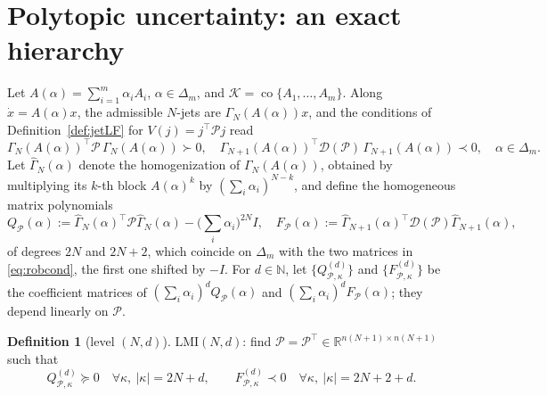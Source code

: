 \documentclass[preprint,12pt,authoryear]{elsarticle}
\theoremstyle{definition}
\newtheorem{definition}[theorem]{Definition}
\theoremstyle{remark}
\newcommand{\R}{\mathbb{R}}
\newcommand{\N}{\mathbb{N}}
\newcommand{\tr}{^{\top}}
\newcommand{\PP}{\mathcal{P}}
\newcommand{\DD}{\mathcal{D}}
\newcommand{\KK}{\mathcal{K}}
\DeclareMathOperator{\co}{co}
\begin{document}
\section{Polytopic uncertainty: an exact hierarchy}\label{sec:polytope}

Let $A(\alpha)=\sum_{i=1}^m\alpha_iA_i$, $\alpha\in\Delta_m$, and $\KK=\co\{A_1,\dots,A_m\}$. Along $\dot x=A(\alpha)x$, the admissible $N$-jets are $\Gamma_N(A(\alpha))x$, and the conditions of Definition~\ref{def:jetLF} for $V(j)=j\tr\PP j$ read
\begin{equation}\label{eq:robcond}
\Gamma_N(A(\alpha))\tr\PP\,\Gamma_N(A(\alpha))\succ0,\quad\Gamma_{N+1}(A(\alpha))\tr\DD(\PP)\,\Gamma_{N+1}(A(\alpha))\prec0,\quad\alpha\in\Delta_m .
\end{equation}
Let $\hat\Gamma_N(\alpha)$ denote the homogenization of $\Gamma_N(A(\alpha))$, obtained by multiplying its $k$-th block $A(\alpha)^k$ by $(\sum_i\alpha_i)^{N-k}$, and define the homogeneous matrix polynomials
\begin{equation}\label{eq:FQ}
Q_\PP(\alpha):=\hat\Gamma_N(\alpha)\tr\PP\hat\Gamma_N(\alpha)-\Big(\sum_i\alpha_i\Big)^{2N}I,\quad F_\PP(\alpha):=\hat\Gamma_{N+1}(\alpha)\tr\DD(\PP)\hat\Gamma_{N+1}(\alpha),
\end{equation}
of degrees $2N$ and $2N+2$, which coincide on $\Delta_m$ with the two matrices in \eqref{eq:robcond}, the first one shifted by $-I$. For $d\in\N$, let $\{Q^{(d)}_{\PP,\kappa}\}$ and $\{F^{(d)}_{\PP,\kappa}\}$ be the coefficient matrices of $(\sum_i\alpha_i)^dQ_\PP(\alpha)$ and $(\sum_i\alpha_i)^dF_\PP(\alpha)$; they depend linearly on $\PP$.

\begin{definition}[level $(N,d)$]
$\mathrm{LMI}(N,d)$: find $\PP=\PP\tr\in\R^{n(N+1)\times n(N+1)}$ such that
\begin{equation}\label{eq:LMINd}
Q^{(d)}_{\PP,\kappa}\succeq0\quad\forall\kappa,\ |\kappa|=2N+d,\qquad F^{(d)}_{\PP,\kappa}\prec0\quad\forall\kappa,\ |\kappa|=2N+2+d .
\end{equation}
\end{definition}
\end{document}
